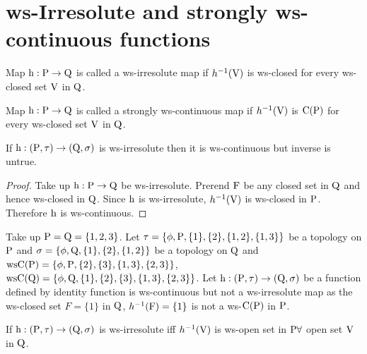 \section{ws-Irresolute and strongly ws-continuous functions}\label{sec3.3}

\begin{dfn}\label{defi3.3.1}
Map $\mathrm{h}: \mathrm{P}\to  \mathrm{Q}$ is called a ws-irresolute map if $h^{-1}(\mathrm{V})$ is ws-closed for every ws-closed set $\mathrm{V}$ in $\mathrm{Q}$.
\end{dfn}

\begin{dfn}\label{defi3.3.2}
Map $\mathrm{h}: \mathrm{P}\to \mathrm{Q}$ is called a strongly ws-continuous map if $h^{-1} (\mathrm{V})$ is $\mathrm{C}(\mathrm{P})$ for every ws-closed set $\mathrm{V}$ in $\mathrm{Q}$.
\end{dfn}

\begin{thm}\label{thm3.3.3}
If $\mathrm{h}: (\mathrm{P},\tau)\to (\mathrm{Q}, \sigma)$ is ws-irresolute then it is ws-continuous but inverse is untrue.
\end{thm}

\begin{proof}
Take up $\mathrm{h}: \mathrm{P}\to \mathrm{Q}$ be ws-irresolute. Prerend $\mathrm{F}$ be any closed set in $\mathrm{Q}$ and hence ws-closed in $\mathrm{Q}$. Since $\mathrm{h}$ is ws-irresolute, $h^{-1} (\mathrm{V})$ is ws-closed in $\mathrm{P}$. Therefore $\mathrm{h}$ is ws-continuous.
\end{proof}

\begin{exm}\label{exam3.3.4}
Take up $\mathrm{P}=\mathrm{Q}= \{1, 2, 3\}$. Let $\tau =\{\phi, \mathrm{P}, \{1\}, \{2\}, \{1, 2\}, \{1, 3\}\}$ be a topology on $\mathrm{P}$ and $\sigma =\{\phi, \mathrm{Q}, \{1\}, \{2\}, \{1, 2\}\}$ be a topology on $\mathrm{Q}$ and $\mathrm{ws}\mathrm{C}(\mathrm{P}) =\{\phi, \mathrm{P}, \{2\},\{3\}, \{1, 3\},\{2, 3\}\}$, $\mathrm{ws}\mathrm{C}(\mathrm{Q})=\{\phi, \mathrm{Q}, \{1\}, \{2\},\{3\}, \{1, 3\},\{2, 3\}\}$. Let $\mathrm{h}: (\mathrm{P}, \tau)\to (\mathrm{Q}, \sigma)$ be a function defined by identity function is ws-continuous but not a ws-irresolute map as the ws-closed set $F=\{1\}$ in $\mathrm{Q}$, $h^{-1} (\mathrm{F})=\{1\}$ is not a ws-$\mathrm{C}(\mathrm{P})$ in $\mathrm{P}$.
\end{exm}

\begin{thm}\label{thm3.3.5}
If $\mathrm{h}: (\mathrm{P}, \tau )\to (\mathrm{Q}, \sigma)$ is ws-irresolute iff $h^{-1} (\mathrm{V})$ is ws-open set in $\mathrm{P}\forall$  open set $\mathrm{V}$ in $\mathrm{Q}$.
\end{thm}

